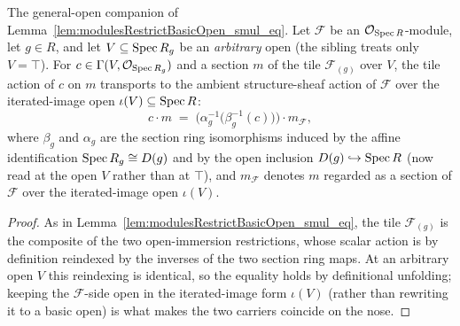 \begin{lemma}\leanok
  \label{lem:modulesRestrictBasicOpen_smul_eq_genV}
  The general-open companion of Lemma~\ref{lem:modulesRestrictBasicOpen_smul_eq}. Let \(\mathcal{F}\)
  be an \(\mathcal{O}_{\operatorname{Spec} R}\)-module, let \(g \in R\), and let \(V \subseteq \operatorname{Spec} R_g\) be an
  \emph{arbitrary} open (the sibling treats only \(V = \top\)). For \(c \in \Gamma(V,
  \mathcal{O}_{\operatorname{Spec} R_g})\) and a section \(m\) of the tile \(\mathcal{F}_{(g)}\) over \(V\), the tile
  action of \(c\) on \(m\) transports to the ambient structure-sheaf action of \(\mathcal{F}\) over the
  iterated-image open \(\iota(V) \subseteq \operatorname{Spec} R\):
  \[
    c \cdot m \;=\; \bigl(\alpha_g^{-1}\bigl(\beta_g^{-1}(c)\bigr)\bigr) \cdot m_{\mathcal{F}},
  \]
  where \(\beta_g\) and \(\alpha_g\) are the section ring isomorphisms induced by the affine
  identification \(\operatorname{Spec} R_g \cong D(g)\) and by the open inclusion \(D(g) \hookrightarrow \operatorname{Spec} R\)
  (now read at the open \(V\) rather than at \(\top\)), and \(m_{\mathcal{F}}\) denotes \(m\) regarded
  as a section of \(\mathcal{F}\) over the iterated-image open \(\iota(V)\).
\end{lemma}
\begin{proof}
  \leanok
  As in Lemma~\ref{lem:modulesRestrictBasicOpen_smul_eq}, the tile \(\mathcal{F}_{(g)}\) is the
  composite of the two open-immersion restrictions, whose scalar action is by definition reindexed by
  the inverses of the two section ring maps. At an arbitrary open \(V\) this reindexing is identical, so
  the equality holds by definitional unfolding; keeping the \(\mathcal{F}\)-side open in the
  iterated-image form \(\iota(V)\) (rather than rewriting it to a basic open) is what makes the two
  carriers coincide on the nose.
\end{proof}

